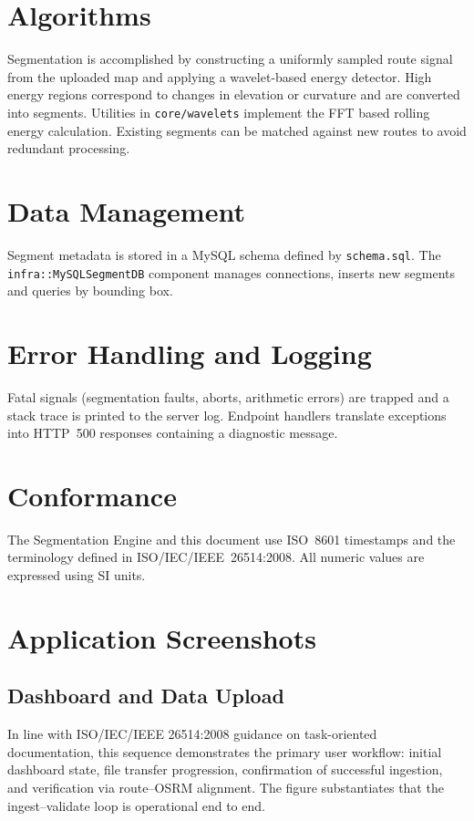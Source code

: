 \documentclass{article}
\begin{document}
\section{Algorithms}
Segmentation is accomplished by constructing a uniformly sampled route signal from the uploaded map and applying a wavelet-based energy detector. High energy regions correspond to changes in elevation or curvature and are converted into segments. Utilities in \texttt{core/wavelets} implement the FFT based rolling energy calculation. Existing segments can be matched against new routes to avoid redundant processing.

\section{Data Management}
Segment metadata is stored in a MySQL schema defined by \texttt{schema.sql}. The \texttt{infra::MySQLSegmentDB} component manages connections, inserts new segments and queries by bounding box.

\section{Error Handling and Logging}
Fatal signals (segmentation faults, aborts, arithmetic errors) are trapped and a stack trace is printed to the server log. Endpoint handlers translate exceptions into HTTP~500 responses containing a diagnostic message.

\section{Conformance}
The Segmentation Engine and this document use ISO~8601 timestamps and the terminology defined in ISO/IEC/IEEE~26514:2008. All numeric values are expressed using SI units.
\newpage
\section{Application Screenshots}

\subsection{Dashboard and Data Upload}
 In line with ISO/IEC/IEEE 26514:2008 guidance on task-oriented documentation, this sequence demonstrates the primary user workflow: initial dashboard state, file transfer progression, confirmation of successful ingestion, and verification via route–OSRM alignment. The figure substantiates that the ingest–validate loop is operational end to end.
\end{document}
